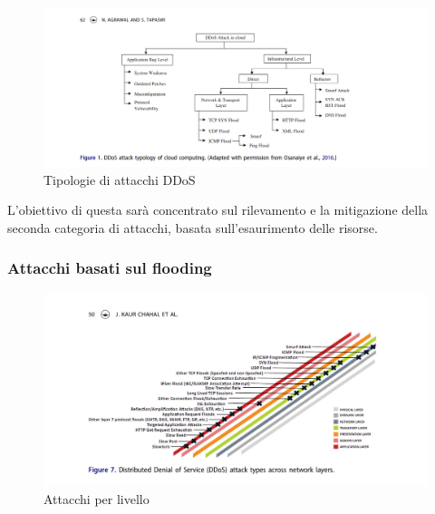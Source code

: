 \begin{figure}[h]
    \includegraphics[width=\hsize]{images/introduzione/tipologie_ddos.png}
    \caption{Tipologie di attacchi DDoS \cite{ddos_survey_3}}
    \centering
\end{figure}

L'obiettivo di questa sarà concentrato sul rilevamento e la mitigazione della seconda categoria di attacchi, basata sull'esaurimento delle risorse.

\subsubsection{Attacchi basati sul flooding}

\begin{figure}[h]
    \includegraphics[width=\hsize]{images/introduzione/attacchi_per_livello.png}
    \caption{Attacchi per livello \cite{ddos_survey_4}}
    \centering
\end{figure}

